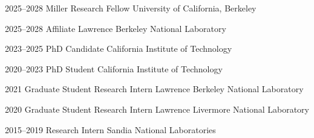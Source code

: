 

\begin{cvskills}

   \cvskill
    {2025--2028} %
    {Miller Research Fellow} %
    {University of California, Berkeley} %

   \cvskill
    {2025--2028} %
    {Affiliate} %
    {Lawrence Berkeley National Laboratory} %

   \cvskill
    {2023--2025} %
    {PhD Candidate} %
    {California Institute of Technology} %

  \cvskill
    {2020--2023} %
    {PhD Student} %
    {California Institute of Technology} %

  \cvskill
    {2021} %
    {Graduate Student Research Intern} %
    {Lawrence Berkeley National Laboratory} %

  \cvskill
    {2020} %
    {Graduate Student Research Intern} %
    {Lawrence Livermore National Laboratory} %


  \cvskill
    {2015--2019} %
    {Research Intern} %
    {Sandia National Laboratories} %
\end{cvskills}
